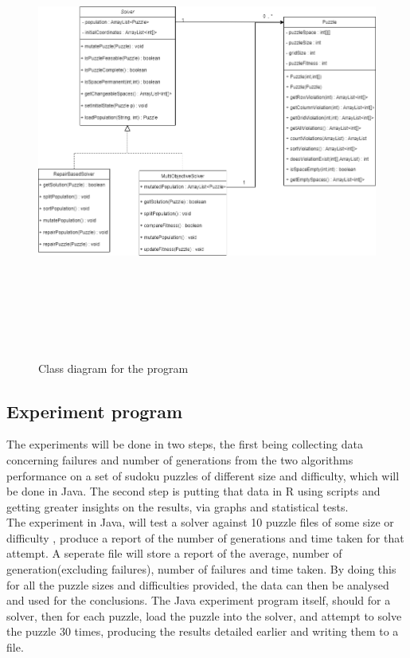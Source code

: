 \documentclass[a4paper,11pt]{article}
\begin{document}
\begin{figure}[h]
	\caption{Class diagram for the program}
	\centering
	\includegraphics[height=15cm,width=18cm]{./Diagrams/classDiagram}
\end{figure}

\subsection{Experiment program }
The experiments will be done in two steps, the first being collecting data concerning failures and number of generations from the two algorithms performance on a set of sudoku puzzles of different size and difficulty, which will be done in Java. The second step is putting that data in R using scripts and getting greater insights on the results, via graphs and statistical tests.\\ The experiment in Java, will test a solver against 10 puzzle files of some size or difficulty , produce a report of the number of generations and time taken for that attempt. A seperate file will store a report of the average, number of generation(excluding failures), number of failures and time taken. By doing this for all the puzzle sizes and difficulties provided, the data can then be analysed and used for the conclusions. The Java experiment program itself, should for a solver, then for each puzzle, load the puzzle into the solver, and attempt to solve the puzzle 30 times, producing the results detailed earlier and writing them to a file.    
\end{document}
